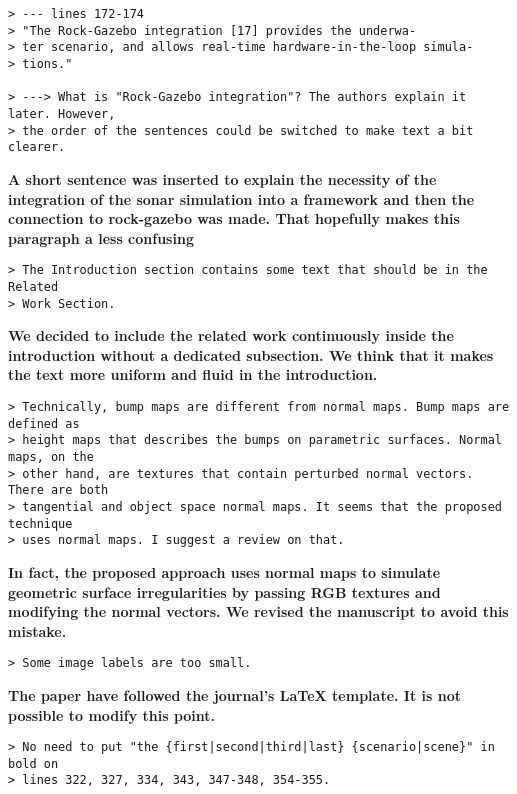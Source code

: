 \documentclass{article}
\begin{document}
\begin{verbatim}
> --- lines 172-174
> "The Rock-Gazebo integration [17] provides the underwa-
> ter scenario, and allows real-time hardware-in-the-loop simula-
> tions."

> ---> What is "Rock-Gazebo integration"? The authors explain it later. However,
> the order of the sentences could be switched to make text a bit clearer.
\end{verbatim}

\textbf{A short sentence was inserted to explain the necessity of the integration of the
sonar simulation into a framework and then the connection to rock-gazebo was made.
That hopefully makes this paragraph a less confusing}

\begin{verbatim}
> The Introduction section contains some text that should be in the Related
> Work Section.
\end{verbatim}

\textbf{We decided to include the related work continuously inside the introduction
without a dedicated subsection. We think that it makes the text more uniform and fluid
in the introduction.}

\begin{verbatim}
> Technically, bump maps are different from normal maps. Bump maps are defined as
> height maps that describes the bumps on parametric surfaces. Normal maps, on the
> other hand, are textures that contain perturbed normal vectors. There are both
> tangential and object space normal maps. It seems that the proposed technique
> uses normal maps. I suggest a review on that.
\end{verbatim}

\textbf{In fact, the proposed approach uses normal maps to simulate geometric surface 
irregularities by passing RGB textures and modifying the normal vectors. We revised the 
manuscript to avoid this mistake.}

\begin{verbatim}
> Some image labels are too small.
\end{verbatim}

\textbf{The paper have followed the journal's LaTeX template. It is not possible to modify
this point.}

\begin{verbatim}
> No need to put "the {first|second|third|last} {scenario|scene}" in bold on
> lines 322, 327, 334, 343, 347-348, 354-355.
\end{verbatim}
\end{document}
